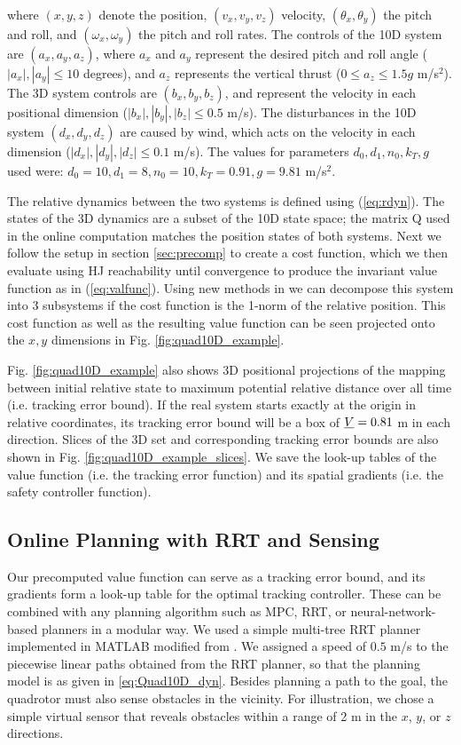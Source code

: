 where $(x, y, z)$ denote the position, $(v_x, v_y, v_z)$ velocity, $(\theta_x, \theta_y)$ the pitch and roll, and $(\omega_x, \omega_y)$ the pitch and roll rates. The controls of the 10D system are $(a_x, a_y, a_z)$, where $a_x$ and $a_y$ represent the desired pitch and roll angle ($|a_x|,|a_y|\leq10$ degrees), and $a_z$ represents the vertical thrust ($0\leq a_z\leq 1.5g$ m/s$^{2}$). The 3D system controls are $(b_x, b_y, b_z)$, and represent the velocity in each positional dimension ($|b_x|,|b_y|,|b_z|\leq0.5$ m/s). The disturbances in the 10D system $(d_x, d_y, d_z)$ are caused by wind, which acts on the velocity in each dimension ($|d_x|,|d_y|,|d_z|\leq0.1$ m/s). The values for parameters $d_0,d_1,n_0,k_T,g$ used were: $d_0=10,d_1=8,n_0=10,k_T=0.91,g=9.81$ m/s$^2$.

The relative dynamics between the two systems is defined using (\ref{eq:rdyn}). The states of the 3D dynamics are a subset of the 10D state space; the matrix Q used in the online computation matches the position states of both systems. Next we follow the setup in section \ref{sec:precomp} to create a cost function, which we then evaluate using HJ reachability until convergence to produce the invariant value function as in (\ref{eq:valfunc}). Using new methods in \cite{Chen2016DecouplingExact, Chen2016DecouplingJournal} we can decompose this system into 3 subsystems if the cost function is the 1-norm of the relative position. This cost function as well as the resulting value function can be seen projected onto the $x,y$ dimensions in Fig. \ref{fig:quad10D_example}.

Fig. \ref{fig:quad10D_example} also shows 3D positional projections of the mapping between initial relative state to maximum potential relative distance over all time (i.e. tracking error bound). If the real system starts exactly at the origin in relative coordinates, its tracking error bound will be a box of $\underline{V} = 0.81$ m in each direction. Slices of the 3D set and corresponding tracking error bounds are also shown in Fig. \ref{fig:quad10D_example_slices}. We save the look-up tables of the value function (i.e. the tracking error function) and its spatial gradients (i.e. the safety controller function).

\subsection{Online Planning with RRT and Sensing}
Our precomputed value function can serve as a tracking error bound, and its gradients form a look-up table for the optimal tracking controller. These can be combined with any planning algorithm such as MPC, RRT, or neural-network-based planners in a modular way. We used a simple multi-tree RRT planner implemented in MATLAB modified from \cite{Gavin2013}. We assigned a speed of $0.5$ m/s to the piecewise linear paths obtained from the RRT planner, so that the planning model is as given in \eqref{eq:Quad10D_dyn}. Besides planning a path to the goal, the quadrotor must also sense obstacles in the vicinity. For illustration, we chose a simple virtual sensor that reveals obstacles within a range of 2 m in the $x$, $y$, or $z$ directions.

